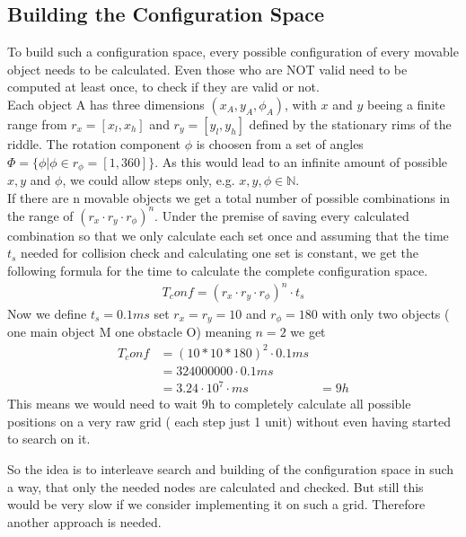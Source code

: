 \subsection{Building the Configuration Space}
\label{subsec:confspace}
To build such a configuration space, every possible configuration of every movable object needs to be calculated. Even those who are NOT valid need to be computed at least once, to check if they are valid or not.\\
Each object A has three dimensions $(x_A,y_A,\phi_A)$, with $x$ and $y$ beeing a finite range from $r_x=[x_l, x_h]$ and $r_y=[y_l, y_h]$ defined by the stationary rims of the riddle. The rotation component $\phi$ is choosen from a set of angles $\Phi = \{ \phi | \phi \in r_\phi=[1, 360] \}$. As this would lead to an infinite amount of possible $x,y$ and $\phi$, we could allow steps only, e.g. $x,y,\phi \in \mathbb{N}$.\\
If there are n movable objects we get a total number of possible combinations in the range of $(r_x\cdot r_y \cdot r_\phi )^n$.
Under the premise of saving every calculated combination so that we only calculate each set once and assuming that the time $t_s$ needed for collision check and calculating one set is constant, we get the following formula for the time to calculate the complete configuration space.
\begin{align*}
 T_conf = (r_x\cdot r_y \cdot r_\phi )^n \cdot t_s
\end{align*}
Now we define $t_s = 0.1 ms$ set $r_x = r_y = 10$ and $r_\phi = 180$ with only two objects ( one main object M one obstacle O) meaning $n=2$ we get
\begin{align*}
T_conf &= (10*10*180)^2 \cdot 0.1ms\\
	&=   324000000 \cdot 0.1 ms\\
	&= 3.24 \cdot 10^7 \cdot ms
	&= 9 h
\end{align*} 
This means we would need to wait 9h to completely calculate all possible positions on a very raw grid ( each step just 1 unit) without even having started to search on it.

So the idea is to interleave search and building of the configuration space in such a way, that only the needed nodes are calculated and checked.
But still this would be very slow if we consider implementing it on such a grid. Therefore another approach is needed.\\


